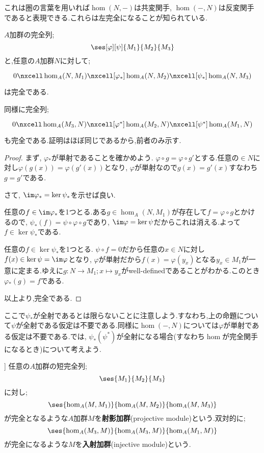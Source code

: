 これは圏の言葉を用いれば$\hom(N,-)$は共変関手, $\hom(-,N)$は反変関手であると表現できる.これらは左完全になることが知られている.
\begin{prop}
$A$加群の完全列;
\[\ses[\varphi][\psi]{M_1}{M_2}{M_3}\]
と,任意の$A$加群$N$に対して;
\[\begin{tikzcd}
0\nxcell\hom_A(N,M_1)\nxcell[\varphi_\ast]\hom_A(N,M_2)\nxcell[\psi_\ast]\hom_A(N,M_3)
\end{tikzcd}\]
は完全である.
\end{prop}

同様に完全列;
\[\begin{tikzcd}
0\nxcell\hom_A(M_3,N)\nxcell[\varphi^\ast]\hom_A(M_2,N)\nxcell[\psi^\ast]\hom_A(M_1,N)
\end{tikzcd}\]
も完全である.証明はほぼ同じであるから,前者のみ示す.
\begin{proof}
	まず, $\varphi{}_\ast $が単射であることを確かめよう. $\varphi\circ g=\varphi\circ g'$とする.任意の$\in N$に対し$\varphi(g(x))=\varphi(g'(x))$となり, $\varphi$が単射なので$g(x)=g'(x)$すなわち$g=g'$である.
	
	さて, $\im\varphi{}_\ast =\ker\psi_\ast $を示せば良い.
	\begin{mrkw}
		\item 
		任意の$f\in\im\varphi_\ast$を1つとる.ある$g\in\hom_A(N,M_1)$が存在して$f=\varphi\circ g$とかけるので, $\psi_\ast (f)=\psi\circ\varphi\circ g$であり, $\im\varphi=\ker\psi$だからこれは消える.よって$f\in\ker\psi_\ast $である.
		\item 
		任意の$f\in\ker\psi_\ast $を1つとる. $\psi\circ f=0$だから任意の$x\in N$に対し$f(x)\in\ker\psi=\im\varphi$となり, $\varphi$が単射だから$f(x)=\varphi(y_x)$となる$y_x\in M_1$が一意に定まる.ゆえに$g:N\to M_1;x\mapsto y_x$がwell-definedであることがわかる.このとき$\varphi{}_\ast (g)=f$である.
	\end{mrkw}
	以上より,完全である.
\end{proof}

ここで$\psi_\ast $が全射であるとは限らないことに注意しよう.すなわち,上の命題について$\psi$が全射である仮定は不要である.同様に$\hom(-,N)$については$\varphi$が単射である仮定は不要である.では, $\psi_\ast(\psi^\ast)$が全射になる場合(すなわち$\hom$が完全関手になるとき)について考えよう.
\begin{defi}
	]
	任意の$A$加群の短完全列;
	\[\ses{M_1}{M_2}{M_3}\]
	に対し;
	\[\ses{\hom_A(M,M_1)}{\hom_A(M,M_2)}{\hom_A(M,M_3)}\]
	が完全となるような$A$加群$M$を\textbf{射影加群}(projective module)という.双対的に;
	\[\ses{\hom_A(M_3,M)}{\hom_A(M_3,M)}{\hom_A(M_1,M)}\]
	が完全になるような$M$を\textbf{入射加群}(injective module)という.
\end{defi}

